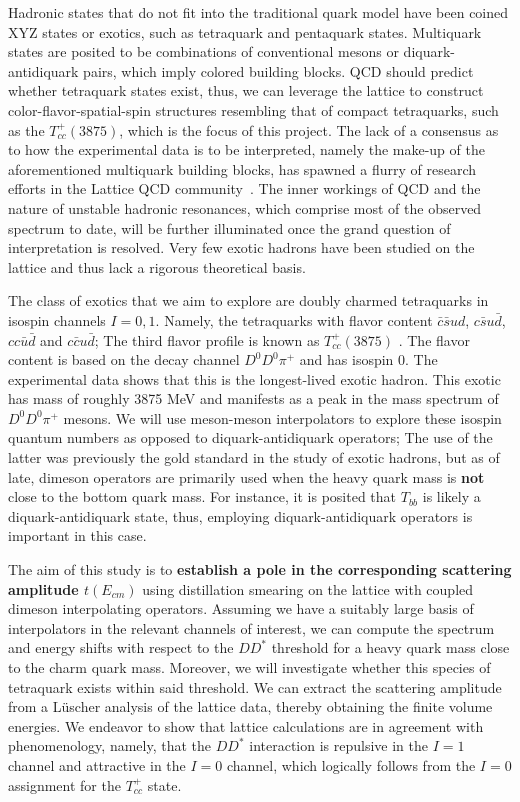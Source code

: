 Hadronic states that do not fit into the traditional quark model have been coined XYZ states \cite{Brambilla:2019esw} or exotics, such as tetraquark and pentaquark states\cite{Cheung_2017}. Multiquark states are posited to be combinations of conventional mesons or diquark-antidiquark pairs, which imply colored building blocks. QCD should predict whether tetraquark states exist, thus, we can leverage the lattice to construct color-flavor-spatial-spin structures resembling that of compact tetraquarks, such as the $T_{cc}^+(3875)$, which is the focus of this project.  The lack of a consensus as to how the experimental data is to be interpreted, namely the make-up of the aforementioned multiquark building blocks, has spawned a flurry of research efforts in the Lattice QCD community~\cite{Cheung_2017}. The inner workings of QCD and the nature of unstable hadronic resonances, which comprise most of the observed spectrum to date,  will be further illuminated once the grand question of interpretation is resolved. Very few exotic hadrons have been studied on the lattice and thus lack a rigorous theoretical basis.

The class of exotics that we aim to explore are doubly charmed tetraquarks in isospin channels $I=0,1$. Namely, the tetraquarks with flavor content $\bar c\bar s ud$, $c\bar s u\bar d$, $cc\bar u\bar d$ and $c\bar c u\bar d$; The third flavor profile is known as $T_{cc}^+(3875)$ \cite{LHCb:2021vvq}. The flavor content is based on the decay channel $D^0D^0\pi^+$ and has isospin 0. The experimental data shows that this is the longest-lived exotic hadron. This exotic has mass of roughly 3875 MeV and manifests as a peak in the mass spectrum of $D^0D^0\pi^+$ mesons.  We will use meson-meson interpolators to explore these isospin quantum numbers as opposed to diquark-antidiquark operators; The use of the latter was previously the gold standard in the study of exotic hadrons, but as of late, dimeson operators are primarily used when the heavy quark mass is \textbf{not} close to the bottom quark mass. For instance, it is posited that $T_{bb}$ is likely a diquark-antidiquark state, thus, employing diquark-antidiquark operators is important in this case.  

The aim of this study is to \textbf{establish a pole in the corresponding scattering amplitude $t(E_{cm})$} using distillation smearing on the lattice with coupled dimeson interpolating operators. Assuming we have a suitably large basis of interpolators in the relevant channels of interest, we can compute the spectrum and energy shifts with respect to the $DD^*$ threshold for a heavy quark mass close to the charm quark mass. Moreover, we will investigate whether this species of tetraquark exists within said threshold. We can extract the scattering amplitude from a L\"{u}scher analysis of the lattice data, thereby obtaining the finite volume energies. We endeavor to show that lattice calculations are in agreement with phenomenology, namely, that the $DD^*$ interaction is repulsive in the $I=1$ channel and attractive in the $I=0$ channel, which logically follows from the $I=0$ assignment for the $T_{cc}^+$ state. 


